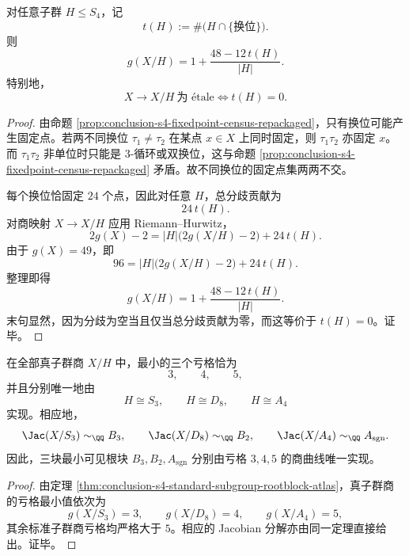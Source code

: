 \begin{theorem}[商曲线亏格的换位计数律]\label{thm:conclusion-s4-quotient-genus-transposition-count-law}
对任意子群 \(H\le S_4\)，记
\[
t(H):=\#\bigl(H\cap\{\text{换位}\}\bigr).
\]
则
\[
g(X/H)=1+\frac{48-12\,t(H)}{|H|}.
\]
特别地，
\[
X\to X/H\ \text{为 \'{e}tale}
\iff
t(H)=0.
\]
\end{theorem}
\begin{proof}
由命题 \ref{prop:conclusion-s4-fixedpoint-census-repackaged}，只有换位可能产生固定点。若两不同换位 \(\tau_1\neq\tau_2\) 在某点 \(x\in X\) 上同时固定，则 \(\tau_1\tau_2\) 亦固定 \(x\)。而 \(\tau_1\tau_2\) 非单位时只能是 \(3\)-循环或双换位，这与命题 \ref{prop:conclusion-s4-fixedpoint-census-repackaged} 矛盾。故不同换位的固定点集两两不交。

每个换位恰固定 \(24\) 个点，因此对任意 \(H\)，总分歧贡献为
\[
24\,t(H).
\]
对商映射 \(X\to X/H\) 应用 Riemann--Hurwitz，
\[
2g(X)-2
=
|H|\bigl(2g(X/H)-2\bigr)+24\,t(H).
\]
由于 \(g(X)=49\)，即
\[
96=|H|\bigl(2g(X/H)-2\bigr)+24\,t(H).
\]
整理即得
\[
g(X/H)=1+\frac{48-12\,t(H)}{|H|}.
\]
末句显然，因为分歧为空当且仅当总分歧贡献为零，而这等价于 \(t(H)=0\)。证毕。
\end{proof}

\begin{corollary}\label{cor:conclusion-s4-proper-quotient-minimal-genus-realization}
在全部真子群商 \(X/H\) 中，最小的三个亏格恰为
\[
3,\qquad 4,\qquad 5,
\]
并且分别唯一地由
\[
H\cong S_3,\qquad H\cong D_8,\qquad H\cong A_4
\]
实现。相应地，
\[
\Jac(X/S_3)\sim_{\QQ} B_3,\qquad
\Jac(X/D_8)\sim_{\QQ} B_2,\qquad
\Jac(X/A_4)\sim_{\QQ} A_{\mathrm{sgn}}.
\]
因此，三块最小可见根块 \(B_3,B_2,A_{\mathrm{sgn}}\) 分别由亏格 \(3,4,5\) 的商曲线唯一实现。
\end{corollary}
\begin{proof}
由定理 \ref{thm:conclusion-s4-standard-subgroup-rootblock-atlas}，真子群商的亏格最小值依次为
\[
g(X/S_3)=3,\qquad g(X/D_8)=4,\qquad g(X/A_4)=5,
\]
其余标准子群商亏格均严格大于 \(5\)。相应的 Jacobian 分解亦由同一定理直接给出。证毕。
\end{proof}

